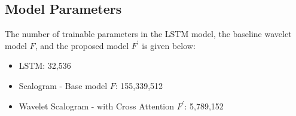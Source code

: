 \subsection{Model Parameters} \label{mp}
The number of trainable parameters in the LSTM model, the baseline wavelet model $F$, and the proposed model $F^{'}$ is given below:

\begin{itemize}
    \item LSTM: 32,536
    \item  Scalogram - Base model $F$: 155,339,512 
    \item  Wavelet Scalogram - with Cross Attention $F^{'}$:  5,789,152 

\end{itemize}


